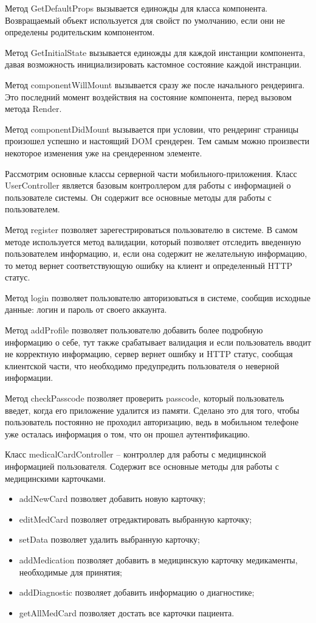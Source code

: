 Метод GetDefaultProps вызывается единожды для класса компонента. Возвращаемый объект используется для свойст по умолчанию, если они не определены родительским компонентом.

Метод GetInitialState вызывается единожды для каждой инстанции компонента, давая возможность инициализировать кастомное состояние каждой инстранции.

Метод componentWillMount вызывается сразу же после начального рендеринга. Это последний момент воздействия на состояние компонента, перед вызовом метода Render.

Метод componentDidMount вызывается при условии, что рендеринг страницы произошел успешно и настоящий DOM срендерен. Тем самым можно произвести некоторое изменения уже на срендеренном элементе.

Рассмотрим основные классы серверной части мобильного-приложения. Класс UserController является базовым контроллером для работы с информацией о пользователе системы. Он содержит все основные методы для работы с пользователем.

Метод register позволяет зарегестрироваться пользователю в системе. В самом методе используется метод валидации, который позволяет отследить введенную пользователем информацию, и, если она содержит не желательную информацию, то метод вернет соответствующую ошибку на клиент и определенный HTTP статус.

Метод login позволяет пользователю авторизоваться в системе, сообщив исходные данные: логин и пароль от своего аккаунта.

Метод addProfile позволяет пользователю добавить более подробную информацию о себе, тут также срабатывает валидация и если пользователь вводит не корректную информацию, сервер вернет ошибку и HTTP статус, сообщая клиентской части, что необходимо предупредить пользователя о неверной информации.

Метод checkPasscode позволяет проверить passcode, который пользователь введет, когда его приложение удалится из памяти. Сделано это для того, чтобы пользователь постоянно не проходил авторизацию, ведь в мобильном телефоне уже осталась информация о том, что он прошел аутентификацию.

Класс medicalCardController -- контроллер для работы с медицинской информацией пользователя. Содержит все основные методы для работы с медицинскими карточками.

\begin{itemize}
  \item addNewCard позволяет добавить новую карточку;
  \item editMedCard позволяет отредактировать выбранную карточку;
  \item setData позволяет удалить выбранную карточку;
  \item addMedication позволяет добавить в медицинскую карточку медикаменты, необходимые для принятия;
  \item addDiagnostic позволяет добавить информацию о диагностике;
  \item getAllMedCard позволяет достать все карточки пациента.
\end{itemize}

